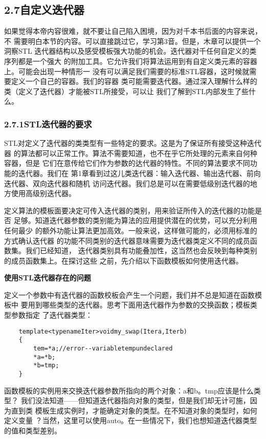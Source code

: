 \subsection{2.7自定义迭代器}
如果觉得本帝内容很难，就不要让自己陷入困境，因为对千本书后面的内容来说，不
需要明白本节的内容。可以直接跳过它，学习第3音。但是，木章可以提供一个洞察STL
迭代器结构以及感受模板强大功能的机会。迭代器对千任何自定义的类序列都是一个强大
的附加工具。它允许我们将算法运用到有自定义类元素的容器上。可能会出现一种情形一
没有可以满足我们需要的标准STL容器，这时候就需要定义一个自己的容器。我们的容器
类可能需要迭代器。通过深入理解什么样的类（定义了迭代器）才能被STL所接受，可以让
我们了解到STL内部发生了些什么。
\subsubsection{2.7.1STL迭代器的要求}
STL对定义了迭代器的类类型有一些特定的要求。这是为了保证所有接受这种迭代器
的算法都可以正常工作。算法不需要知道，也不在乎它所处理的元素来自何种容器，但是
它们在意传给它们作为参数的达代器的特性。不同的算法要求不同功能的迭代器。我们在
第1章看到过这儿类迭代器：输入迭代器、输出迭代器、前向迭代器、双向迭代器和随机
访问迭代器。我们总是可以在需要低级别迭代器的地方使用高级别迭代器。

定义算法的模板面要决定可传入迭代器的类别，用来验证所传入的迭代器的功能是否
足够。知道迭代器参数的类别能为算法的应用提供潜在的优势，可以充分利用任何最少
的额外功能让算法更加高效。一般来说，这样做可能的，必须用标准的方式确认迭代器
的功能不同类别的迭代器意味需要为迭代器类定义不同的成员函数集。我们已经知道，
迭代器类别具有功能叠加性，这当然也会反映到每种类别的成员函数集上。在探讨这些
之前，先介绍以下函数模板如何使用迭代器。

\textbf{使用STL迭代器存在的问题}

定义一个参数中有迭代器的函数校板会产生一个问题，我们并不总是知道在函数模板中
要用到哪些类型的迭代器。思考下面用迭代器作为参数的交换函数；模板类型参数指定
了迭代器类型：
\begin{verbatim}
	template<typenameIter>voidmy_swap(Itera,Iterb)
	{
		tem=*a;//error--variabletempundeclared
		*a=*b;
		*b=tmp;
	}

\end{verbatim}

函数模板的实例用来交换迭代器参数所指向的两个对象：a和b。tmp应该是什么类型？
我们没法知道——但知道迭代器指向对象的类型，但是我们却无计可施，因为直到类
模板生成实例时，才能确定对象的类型。在不知道对象的类型时，如何定义变量
？当然，这里可以使用auto。在一些情况下，我们也想知道迭代器类型的值和类型差别。


